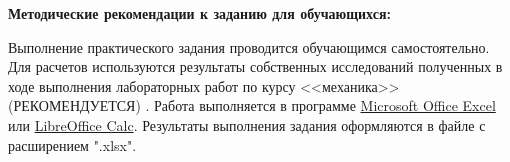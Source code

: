 \textbf{Методические рекомендации к заданию для обучающихся:} 

Выполнение практического задания проводится обучающимся
самостоятельно. Для расчетов используются результаты собственных
исследований полученных в ходе выполнения лабораторных работ по курсу <<механика>> (РЕКОМЕНДУЕТСЯ)
. 
Работа выполняется в программе \href{https://mega.nz/folder/0EUyAKgC#4X5RubnYkoUUJYhwDDpKbg}{Microsoft Office Excel} или \href{https://www.libreoffice.org/download/download-libreoffice/?type=win-x86_64&version=7.4.0&lang=ru-RU}{LibreOffice Calc}. Результаты выполнения задания оформляются в файле с расширением ".xlsx". 